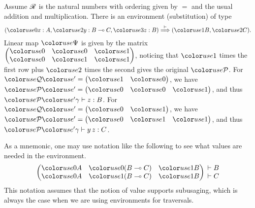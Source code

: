 \begin{example}
  Assume $\mathscr R$ is the natural numbers with ordering given by $=$ and the usual
  addition and multiplication.
  There is an environment (substitution) of type
  \[
    \plr{\gr0x : A, \gr2y : B \multimap C, \gr3z : B} \env\vdash
    \plr{\gr1B, \gr2C}.
  \]
  Linear map $\gr\Psi$ is given by the matrix
  \(
    \begin{pmatrix}
      \gr0 & \gr0 & \gr1 \\
      \gr0 & \gr1 & \gr1
    \end{pmatrix}
  \),
  noticing that $\gr1$ times the first row plus $\gr2$ times the second gives
  the original $\grP$.
  For $\grQprime = \begin{pmatrix} \gr1 & \gr0 \end{pmatrix}$, we have
  $\grPprime = \begin{pmatrix} \gr0 & \gr0 & \gr1 \end{pmatrix}$, and thus
  $\grPprime\gamma \vdash z : B$.
  For $\grQprime = \begin{pmatrix} \gr0 & \gr1 \end{pmatrix}$, we have
  $\grPprime = \begin{pmatrix} \gr0 & \gr1 & \gr1 \end{pmatrix}$, and thus
  $\grPprime\gamma \vdash y\,z : C$.
\end{example}

As a mnemonic, one may use notation like the following to see what values are
needed in the environment.
\[
  \begin{pmatrix}
    \gr0A & \gr0\plr{B \multimap C} & \gr1B \\
    \gr0A & \gr1\plr{B \multimap C} & \gr1B
  \end{pmatrix}
  \begin{matrix}
    {} \vdash B \\
    {} \vdash C
  \end{matrix}
\]
This notation assumes that the notion of value supports subusaging, which is
always the case when we are using environments for traversals.


